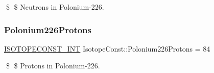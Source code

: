 \$ \$ Neutrons in Polonium-\/226. \mbox{\label{group___isotope_const-_polonium-_po226_ga5bc152b2728947e3c326a7191160f057}} 
\subsubsection{\texorpdfstring{Polonium226\+Protons}{Polonium226Protons}}
{\footnotesize\ttfamily \mbox{\hyperlink{group___isotope_const-_macros_ga5f18360b3e99483a35c32d789e62621c}{I\+S\+O\+T\+O\+P\+E\+C\+O\+N\+S\+T\+\_\+\+I\+NT}} Isotope\+Const\+::\+Polonium226\+Protons = 84}

\$ \$ Protons in Polonium-\/226. 